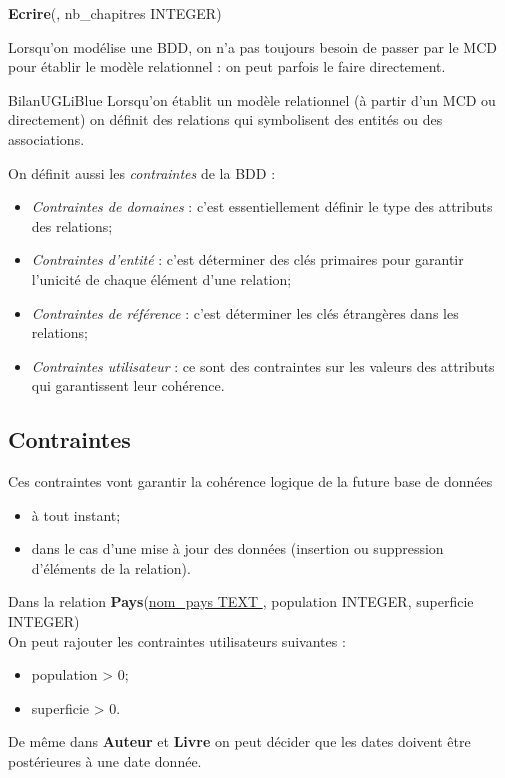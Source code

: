 \documentclass[10pt,cours,a4paper,firamath]{nsi}
\begin{document}
\textbf{Ecrire}(\uline{}, nb\_chapitres INTEGER)\\


\begin{remarque}[]
	Lorsqu'on modélise une BDD, on n'a pas toujours besoin de passer par le MCD pour établir le modèle relationnel : on peut parfois le faire directement.
\end{remarque}

\begin{encadrecolore}{Bilan}{UGLiBlue}
	Lorsqu'on établit un modèle relationnel (à partir d'un MCD ou directement) on définit des relations qui symbolisent des entités ou des associations.
	
	On définit aussi les \textit{contraintes} de la BDD :
	\begin{itemize}
		\item	\textit{Contraintes de domaines} : c'est essentiellement définir le type des attributs des relations;
		\item	\textit{Contraintes d'entité} : c'est déterminer des clés primaires pour garantir l'unicité de chaque élément d'une relation;
		\item 	\textit{Contraintes de référence} : c'est déterminer les clés étrangères dans les relations;
		\item 	\textit{Contraintes utilisateur} : ce sont des contraintes sur les valeurs des attributs qui garantissent leur cohérence.
	\end{itemize}
\end{encadrecolore}

\subsection{Contraintes}
Ces contraintes vont garantir la cohérence logique de la future base de données
\begin{itemize}
	\item	à tout instant;
	\item	dans le cas d'une mise à jour des données (insertion ou suppression d'éléments de la relation).
\end{itemize}

\begin{exemple}
	Dans la relation \textbf{Pays}(\uline{nom\_pays TEXT }, population INTEGER, superficie INTEGER)\\
	
	On peut rajouter les contraintes utilisateurs suivantes :
	\begin{itemize}
		\item 	population > 0;
		\item 	superficie > 0.
	\end{itemize}
	De même dans \textbf{Auteur} et \textbf{Livre} on peut décider que les dates doivent être postérieures à une date donnée.	
\end{exemple}
\end{document}
